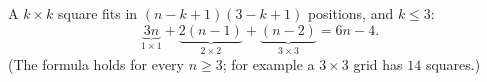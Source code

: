 A $k\times k$ square fits in $(n-k+1)(3-k+1)$ positions, and $k\le3$:
\[
\underbrace{3n}_{1\times1}+\underbrace{2(n-1)}_{2\times2}+\underbrace{(n-2)}_{3\times3}=\boxed{6n-4}.
\]
(The formula holds for every $n\ge3$; for example a $3\times3$ grid has $14$ squares.)
